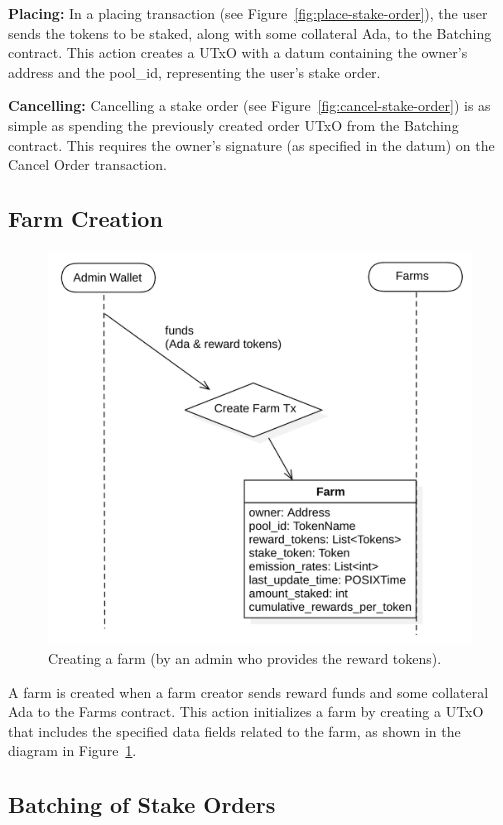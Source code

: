 \documentclass[12pt,parskip=full, tikz]{article}
\begin{document}
\textbf{Placing:} In a placing transaction (see Figure~\ref{fig:place-stake-order}), the user sends the tokens to be staked, along with some collateral Ada, to the Batching contract. This action creates a UTxO with a datum containing the owner's address and the pool\_id, representing the user's stake order.

\textbf{Cancelling:} Cancelling a stake order  (see Figure~\ref{fig:cancel-stake-order}) is as simple as spending the previously created order UTxO from the Batching contract. This requires the owner's signature (as specified in the datum) on the Cancel Order transaction.

\subsection{Farm Creation}

\begin{figure}
    \centering
    \includegraphics[width=.5\textwidth]{figures/create-farm-admin.png}
    \caption{Creating a farm (by an admin who provides the reward tokens).}
    \label{fig:create-farm-admin}
\end{figure}

A farm is created when a farm creator sends reward funds and some collateral Ada to the Farms contract. This action initializes a farm by creating a UTxO that includes the specified data fields related to the farm, as shown in the diagram in Figure~\ref{fig:create-farm-admin}.

\subsection{Batching of Stake Orders}
\end{document}

